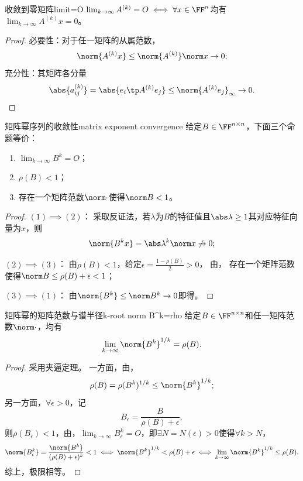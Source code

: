 \begin{theorem}
    {收敛到零矩阵}{limit=O}
    $\lim_{k\to\infty}A^{(k)}=O\iff\forall x\in\FF^n$均有$\lim_{k\to\infty}A^{(k)}x=0$。
\end{theorem}

\begin{proof}
    必要性：对于任一矩阵的从属范数，
    \[
        \norm{A^{(k)}x}\leq\norm{A^{(k)}}\norm x\to0;
    \]
    充分性：其矩阵各分量
    \[
        \abs{a_{ij}^{(k)}}=\abs{e_i\tp A^{(k)}e_j}\leq\norm{A^{(k)}e_j}_\infty\to 0.
        \qedhere
    \]
\end{proof}

\begin{theorem}
    {矩阵幂序列的收敛性}{matrix exponent convergence}
    给定$B\in\FF^{n\times n}$，下面三个命题等价：
    \begin{enumerate}
        \item $\lim_{k\to\infty}B^k=O$；
        \item $\rho(B)<1$；
        \item 存在一个矩阵范数$\norm\cdot$使得$\norm B<1$。
    \end{enumerate}
\end{theorem}

\begin{proof}
    $(1)\implies(2)$：
    采取反证法，若$\lambda$为$B$的特征值且$\abs\lambda\geq 1$其对应特征向量为$x$，则 
    \[
        \norm{B^kx}=\abs\lambda^k\norm x\not\to 0;
    \]

    $(2)\implies(3)$：
    由$\rho(B)<1$，给定$\epsilon=\frac{1-\rho(B)}2>0$，
    由，
    存在一个矩阵范数使得$\norm B\leq\rho(B)+\epsilon<1$；

    $(3)\implies(1)$：
    由$\norm{B^k}\leq\norm B^k\to0$即得。
\end{proof}

\begin{theorem}
    {矩阵幂的矩阵范数与谱半径}{k-root norm B^k=rho}
    给定$B\in\FF^{n\times n}$和任一矩阵范数$\norm\cdot$，均有
    \begin{equation}
        \lim_{k\to\infty}\norm{B^k}^{1/k}=\rho(B).
    \end{equation}
\end{theorem}

\begin{proof}
    采用夹逼定理。
    一方面，由，
    \[
        \rho(B)=\rho(B^k)^{1/k}\leq\norm{B^k}^{1/k};
    \]
    另一方面，$\forall\epsilon>0$，记 
    \[
        B_\epsilon=\frac{B}{\rho(B)+\epsilon},
    \]
    则$\rho(B_\epsilon)<1$，由，$\lim_{k\to\infty}B_\epsilon^k=O$，即$\exists N=N(\epsilon)>0$使得$\forall k>N$，
    \[
        \norm{B_\epsilon^k}=\frac{\norm{B^k}}{(\rho(B)+\epsilon)^k}<1\iff\norm{B^k}^{1/k}<\rho(B)+\epsilon\iff\lim_{k\to\infty}\norm{B^k}^{1/k}\leq\rho(B).
    \]
    综上，极限相等。    
\end{proof}

